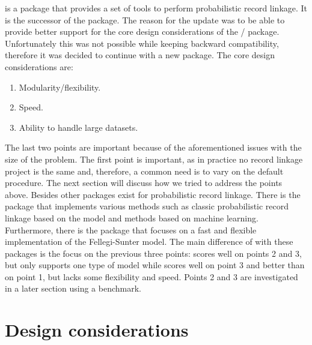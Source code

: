  is a package that provides a set of tools to perform probabilistic record linkage. It
is the successor of the  package. The reason for the update was to be able to provide
better support for the core design considerations of the / package.
Unfortunately this was not possible while keeping backward compatibility, therefore it was decided
to continue with a new package. The core design considerations are:
\begin{enumerate}
  \item Modularity/flexibility.
  \item Speed.
  \item Ability to handle large datasets. 
\end{enumerate}
The last two points are important because of the aforementioned issues with the size of the
problem. The first point is important, as in practice no record linkage project is the same and,
therefore, a common need is to vary on the default procedure.  The next section will discuss how
we tried to address the points above. Besides  other packages exist for
probabilistic record linkage. There is the  \citep{RecordLinkage}
package that implements various methods such as classic probabilistic record linkage based on the
\citet{fs} model and methods based on machine learning. Furthermore, there is the 
\citep{fastlink, fastlink2} package that focuses on a fast and flexible implementation of the
Fellegi-Sunter model. The main difference of  with these packages is the focus on the
previous three points:  scores well on points 2 and 3, but only supports one type of
model while  scores well on point 3 and better than  on point 1,
but lacks some flexibility and speed. Points 2 and 3 are investigated in a later section using a
benchmark.

\section{Design considerations}

